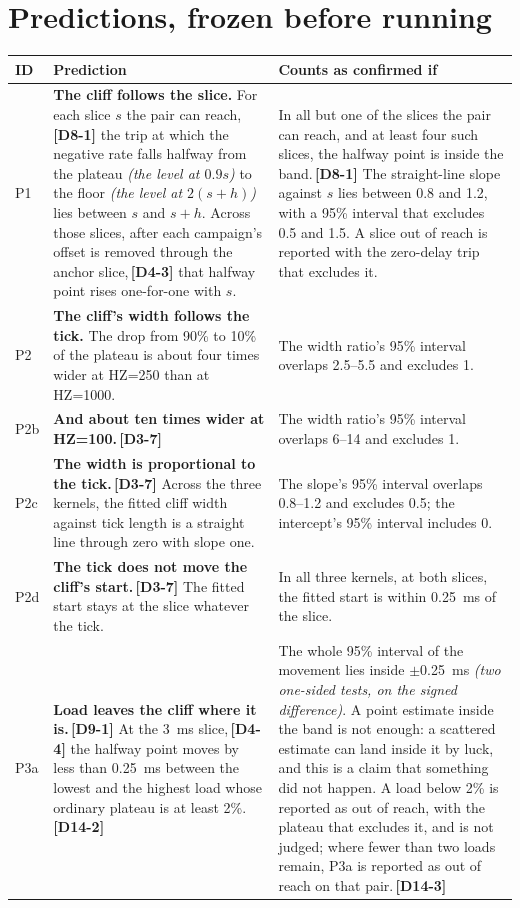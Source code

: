 \documentclass[11pt]{article}
\newcommand{\gl}[1]{{\color{soft}\itshape\small (#1)}}
\newcommand{\chg}[1]{\,{\color{chgcol}\bfseries\footnotesize[#1]}}
\newcommand{\chgold}[1]{\,{\color{oldcol}\bfseries\footnotesize[#1]}}
\begin{document}
\section{Predictions, frozen before running}\label{sec:predictions}
{\small
\begin{longtable}{@{}p{1.0cm} p{9.5cm} p{5.6cm}@{}}
\toprule
\textbf{ID} & \textbf{Prediction} & \textbf{Counts as confirmed if} \\
\midrule
\endhead
P1 & \textbf{The cliff follows the slice.} For each slice $s$ the pair can reach,\chg{D8-1} the trip at which the negative rate falls halfway from the plateau \gl{the level at $0.9s$} to the floor \gl{the level at $2(s+h)$} lies between $s$ and $s + h$. Across those slices, after each campaign's offset is removed through the anchor slice,\chgold{D4-3} that halfway point rises one-for-one with $s$. & In all but one of the slices the pair can reach, and at least four such slices, the halfway point is inside the band.\chg{D8-1} The straight-line slope against $s$ lies between 0.8 and 1.2, with a 95\% interval that excludes 0.5 and 1.5. A slice out of reach is reported with the zero-delay trip that excludes it. \\
P2 & \textbf{The cliff's width follows the tick.} The drop from 90\% to 10\% of the plateau is about four times wider at HZ=250 than at HZ=1000. & The width ratio's 95\% interval overlaps 2.5--5.5 and excludes 1. \\
P2b & \textbf{And about ten times wider at HZ=100.}\chgold{D3-7} & The width ratio's 95\% interval overlaps 6--14 and excludes 1. \\
P2c & \textbf{The width is proportional to the tick.}\chgold{D3-7} Across the three kernels, the fitted cliff width against tick length is a straight line through zero with slope one. & The slope's 95\% interval overlaps 0.8--1.2 and excludes 0.5; the intercept's 95\% interval includes 0. \\
P2d & \textbf{The tick does not move the cliff's start.}\chgold{D3-7} The fitted start stays at the slice whatever the tick. & In all three kernels, at both slices, the fitted start is within 0.25~ms of the slice. \\
P3a & \textbf{Load leaves the cliff where it is.}\chgold{D9-1} At the 3~ms slice,\chgold{D4-4} the halfway point moves by less than 0.25~ms between the lowest and the highest load whose ordinary plateau is at least 2\%.\chg{D14-2} & The whole 95\% interval of the movement lies inside $\pm$0.25~ms \gl{two one-sided tests, on the signed difference}. A point estimate inside the band is not enough: a scattered estimate can land inside it by luck, and this is a claim that something did not happen. A load below 2\% is reported as out of reach, with the plateau that excludes it, and is not judged; where fewer than two loads remain, P3a is reported as out of reach on that pair.\chg{D14-3} \\

\end{longtable}}
\end{document}
